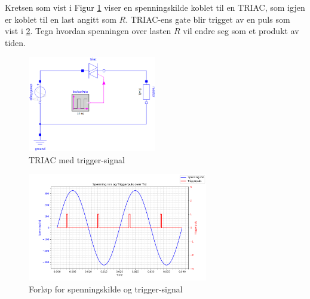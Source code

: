 \begin{question}[name=Spørsmål, topic=tyristor]
	Kretsen som vist i Figur \ref{fig:triacTriggplot} viser en spenningskilde koblet til en TRIAC, som igjen er koblet til en last angitt som $R$. TRIAC-ens gate blir trigget av en puls som vist i \ref{fig:triacForTriggplot}. Tegn hvordan spenningen over lasten $R$ vil endre seg som et produkt av tiden.
	\begin{figure}[H]
		\centering
		\includegraphics[width=0.5\textwidth]{tyristor/figurer/triac.png}
		\caption{TRIAC med trigger-signal}
		\label{fig:triacTriggplot}
	\end{figure}

	\begin{figure}[H]
		\centering
		\includegraphics[width=0.7\textwidth]{tyristor/plot/triac.png}
		\caption{Forløp for spenningskilde og trigger-signal}
		\label{fig:triacForTriggplot}
	\end{figure}


\end{question}

\vspace{0.5cm} %

